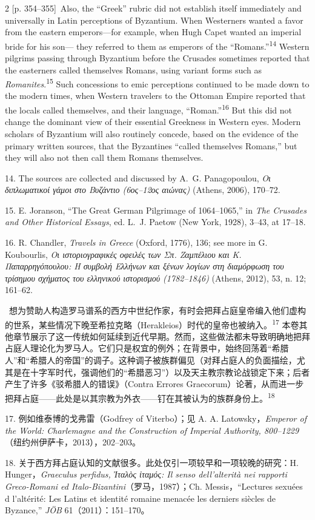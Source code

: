 \documentclass[10pt,a4paper]{article}
\begin{document}
\begin{paracol}{2}
{\scriptsize\color{gray}[p. 354–355]}\ Also, the “Greek” rubric did not establish itself immediately and universally in Latin perceptions of Byzantium. When Westerners wanted a favor from the eastern emperors—for example, when Hugh Capet wanted an imperial bride for his son— they referred to them as emperors of the “Romans.”\nobreak\textsuperscript{14} Western pilgrims passing through Byzantium before the Crusades sometimes reported that the easterners called themselves Romans, using variant forms such as \textit{Romanites}.\nobreak\textsuperscript{15} Such concessions to emic perceptions continued to be made down to the modern times, when Western travelers to the Ottoman Empire reported that the locals called themselves, and their language, “Roman.”\nobreak\textsuperscript{16} But this did not change the dominant view of their essential Greekness in Western eyes. Modern scholars of Byzantium will also routinely concede, based on the evidence of the primary written sources, that the Byzantines “called themselves Romans,” but they will also not then call them Romans themselves.\par{\small 14. The sources are collected and discussed by A. G. Panagopoulou, \textit{Οι διπλωματικοί γάμοι στο Βυζάντιο (6ος–12ος αιώνας)} (Athens, 2006), 170–72.\par}{\small 15.  E. Joranson, “The Great German Pilgrimage of 1064–1065,” in \textit{The Crusades and Other Historical Essays}, ed. L. J. Paetow (New York, 1928), 3–43, at 17–18.\par}{\small 16. R. Chandler, \textit{Travels in Greece} (Oxford, 1776), 136; see more in G. Koubourlis, \textit{Οι ιστοριογραφικές οφειλές των Σπ. Ζαμπέλιου και Κ. Παπαρρηγόπουλου: Η συμβολή Ελλήνων και ξένων λογίων στη διαμόρφωση του τρίσημου σχήματος του ελληνικού ιστορισμού (1782–1846)} (Athens, 2012), 53, n. 12; 161–62.\par}
\switchcolumn*
{\scriptsize\color{gray}[p. 355]}\ 想为赞助人构造罗马谱系的西方中世纪作家，有时会把拜占庭皇帝编入他们虚构的世系，某些情况下晚至希拉克略（Herakleios）时代的皇帝也被纳入。\nobreak\textsuperscript{17} 本卷其他章节展示了这一传统如何延续到近代早期。然而，这些做法都未导致明确地把拜占庭人理论化为罗马人。它们只是权宜的例外；在背景中，始终回荡着“希腊人”和“希腊人的帝国”的调子。这种调子被族群偏见（对拜占庭人的负面描绘，尤其是在十字军时代，强调他们的“希腊恶习”）以及天主教宗教论战锁定下来；后者产生了许多《驳希腊人的错误》（Contra Errores Graecorum）论著，从而进一步把拜占庭——此处是以其宗教为外衣——钉在其被认为的族群身份上。\nobreak\textsuperscript{18}\par{\small 17. 例如维泰博的戈弗雷（Godfrey of Viterbo）；见 A. A. Latowsky，\textit{Emperor of the World: Charlemagne and the Construction of Imperial Authority, 800–1229}（纽约州伊萨卡，2013），202–203。\par}{\small 18. 关于西方拜占庭认知的文献很多。此处仅引一项较早和一项较晚的研究：H. Hunger，\textit{Graeculus perfidus, Ἰταλὸς ἰταμός: Il senso dell’alterità nei rapporti Greco-Romani ed Italo-Bizantini}（罗马，1987）；Ch. Messis，“Lectures sexuées d l’altérité: Les Latins et identité romaine menacée les derniers siècles de Byzance,” \textit{JÖB} 61（2011）：151–170。\par}

\end{paracol}
\end{document}
